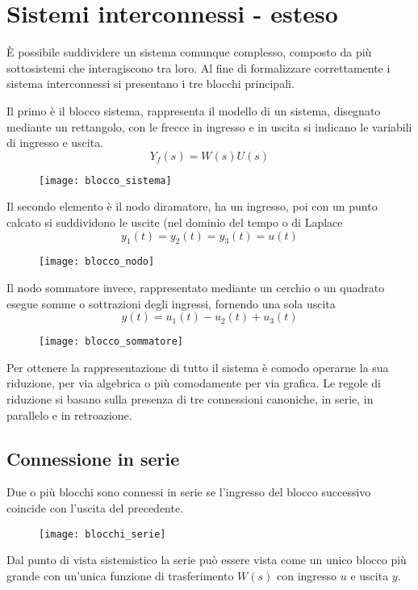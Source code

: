 
\section{Sistemi interconnessi - esteso}
È possibile suddividere un sistema comunque complesso, composto da più
sottosistemi che interagiscono tra loro.
Al fine di formalizzare correttamente i sistema interconnessi si presentano i
tre blocchi principali.

Il primo è il blocco sistema, rappresenta il modello di un sistema, disegnato
mediante un rettangolo, con le frecce in ingresso e in uscita si indicano le
variabili di ingresso e uscita.
$$
Y_f(s) = W(s)U(s)
$$
\begin{figure}[h]
\centering
\texttt{[image: blocco\_sistema]}
\end{figure}

Il secondo elemento è il nodo diramatore, ha un ingresso, poi con un punto
calcato si suddividono le uscite (nel dominio del tempo o di Laplace
$$
y_1(t) = y_2(t) = y_3(t) = u(t)
$$
\begin{figure}[h]
\centering
\texttt{[image: blocco\_nodo]}
\end{figure}

\newpage
Il nodo sommatore invece, rappresentato mediante un cerchio o un quadrato
esegue somme o sottrazioni degli ingressi, fornendo una sola uscita
$$
y(t) = u_1(t) - u_2(t) + u_3(t)
$$
\begin{figure}[h]
 \centering
 \texttt{[image: blocco\_sommatore]}
\end{figure}

Per ottenere la rappresentazione di tutto il sistema è comodo operarne la sua
riduzione, per via algebrica o più comodamente per via grafica.
Le regole di riduzione si basano sulla presenza di tre connessioni canoniche,
in serie, in parallelo e in retroazione.

\subsection{Connessione in serie}
Due o più blocchi sono connessi in serie se l'ingresso del blocco
successivo coincide con l'uscita del precedente.
\begin{figure}[h]
\centering
\texttt{[image: blocchi\_serie]}
\end{figure}
Dal punto di vista sistemistico la serie può essere vista come un unico blocco
più grande con un'unica funzione di trasferimento $W(s)$ con ingresso $u$ e
uscita $y$.

